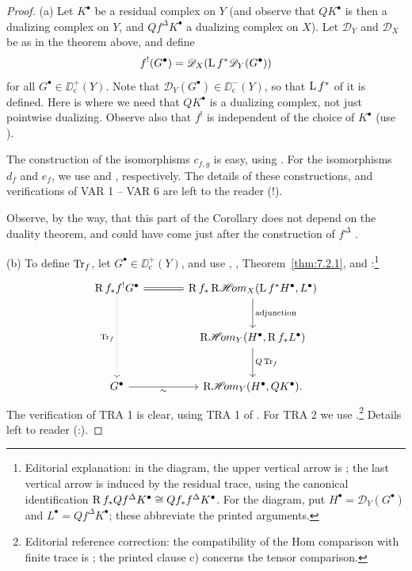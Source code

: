 \begin{proof}
(a) Let $K^{\bullet}$ be a residual complex on $Y$ (and observe that $Q K^{\bullet}$ is then a dualizing complex on $Y$, and $Q f^{\Delta} K^{\bullet}$ a dualizing complex on $X$). Let $\mathscr{D}_{Y}$ and $\mathscr{D}_{X}$ be as in the theorem above, and define
\[
f^{!}(G^{\bullet}) = \mathscr{D}_{X}(\operatorname{L} f^{*} \mathscr{D}_{Y}(G^{\bullet}))
\]
for all $G^{\bullet} \in \DD_{\mathrm{c}}^{+}(Y)$. Note that $\mathscr{D}_{Y}(G^{\bullet}) \in \DD_{\mathrm{c}}^{-}(Y)$, so that $\operatorname{L} f^{*}$ of it is defined. Here is where we need that $Q K^{\bullet}$ is a dualizing complex, not just pointwise dualizing. Observe also that $f^{!}$ is independent of the choice of $K^{\bullet}$ (use ).

The construction of the isomorphisms $c_{f,g}$ is easy, using . For the isomorphisms $d_{f}$ and $e_{f}$, we use  and , respectively. The details of these constructions, and verifications of VAR 1 -- VAR 6 are left to the reader (!).

Observe, by the way, that this part of the Corollary does not depend on the duality theorem, and could have come just after the construction of $f^{\Delta}$ .

\medskip\noindent(b) To define $\operatorname{Tr}_{f}$, let $G^{\bullet} \in \DD_{\mathrm{c}}^{+}(Y)$, and use , , Theorem~\ref{thm:7.2.1}, and :\footnote{Editorial explanation: in the diagram, the upper vertical arrow is ; the last vertical arrow is induced by the residual trace, using the canonical identification $\operatorname{R} f_*Qf^\Delta K^\bullet\cong Qf_*f^\Delta K^\bullet$. For the diagram, put $H^\bullet=\mathscr{D}_Y(G^\bullet)$ and $L^\bullet=Qf^\Delta K^\bullet$; these abbreviate the printed arguments.}
\[
\begin{tikzcd}[row sep=large, column sep=large]
\RR f_*f^!G^\bullet \ar[r,equals] \ar[dd,dotted,"\Tr_f"']
 & \RR f_*\RsheafHom_X(\LL f^*H^\bullet,L^\bullet)
   \ar[d,"\text{adjunction}"] \\
 & \RsheafHom_Y(H^\bullet,\RR f_*L^\bullet)
   \ar[d,"Q\Tr_f"] \\
G^\bullet \ar[r,"\sim"']
 & \RsheafHom_Y(H^\bullet,QK^\bullet).
\end{tikzcd}
\]
The verification of TRA 1 is clear, using TRA 1 of . For TRA 2 we use .\footnote{Editorial reference correction: the compatibility of the Hom comparison with finite trace is ; the printed clause c) concerns the tensor comparison.} Details left to reader (:).


\end{proof}
